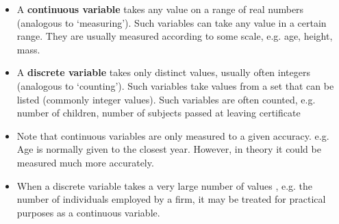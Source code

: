 \documentclass[a4paper,12pt]{article}
\begin{document}
%



 \begin{itemize}
	\item A \textbf{continuous variable} takes any value on a range of real numbers (analogous to
	`measuring’). Such variables can take any
	value in a certain range. They are usually measured
	according to some scale, e.g. age, height, mass.
	\item A \textbf{discrete variable} takes only distinct values, usually often integers (analogous to
	`counting’). Such variables take values from a
	set that can be listed (commonly integer values).
	Such variables are often counted, e.g. number of
	children, number of subjects passed at leaving
	certificate

\end{itemize}



\begin{itemize}
\item Note that continuous variables are only measured to a given
accuracy.
e.g. Age is normally given to the closest year. However, in theory
it could be measured much more accurately.
\item When a discrete variable takes a very large number of values , e.g.
the number of individuals employed by a firm, it may be treated for
practical purposes as a continuous variable.
\end{itemize}
%
\end{document}
